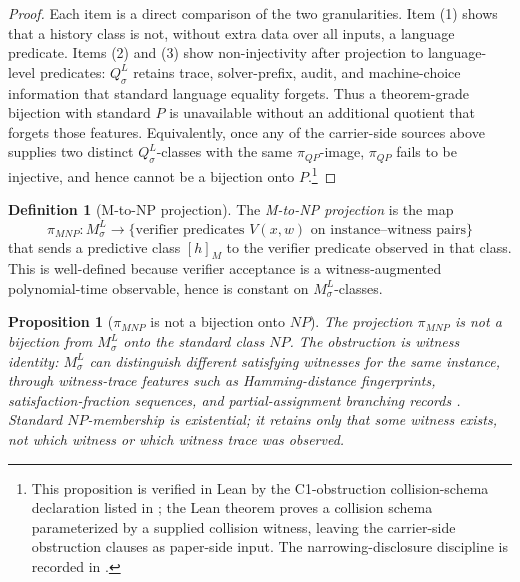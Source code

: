 \documentclass[11pt]{article}
\newcommand{\Substrate}{\sigma}             \newcommand{\Lift}{L}                       \newcommand{\LiftState}{\sigma_{L}}         \newcommand{\HistorySpace}{H_{\Substrate}^{\Lift}}
\newcommand{\Qquotient}{Q_{\Substrate}^{\Lift}}
\newcommand{\Mquotient}{M_{\Substrate}^{\Lift}}
\newcommand{\Mclass}[1]{[#1]_{M}}
\newcommand{\PiQP}{\pi_{QP}}                \newcommand{\PiMNP}{\pi_{MNP}}
\newtheorem{proposition}[theorem]{Proposition}
\theoremstyle{definition}
\newtheorem{definition}[theorem]{Definition}
\begin{document}
\begin{proof}
Each item is a direct comparison of the two granularities.  Item (1)
shows that a history class is not, without extra data over all inputs,
a language predicate.  Items (2) and (3) show non-injectivity after
projection to language-level predicates: \(\Qquotient\) retains trace,
solver-prefix, audit, and machine-choice information that standard
language equality forgets.  Thus a theorem-grade bijection with
standard \(P\) is unavailable without an additional quotient that
forgets those features.  Equivalently, once any of the carrier-side
sources above supplies two distinct \(\Qquotient\)-classes with the same
\(\PiQP\)-image, \(\PiQP\) fails to be injective, and hence cannot be a
bijection onto \(P\).\footnote{This proposition is verified in Lean by
the C1-obstruction collision-schema declaration listed in
; the Lean theorem proves a collision schema
parameterized by a supplied collision witness, leaving the carrier-side
obstruction clauses as paper-side input.  The narrowing-disclosure
discipline is recorded in .}
\end{proof}

\begin{definition}[M-to-NP projection]
\label{def:projection-m-to-np}
The \emph{M-to-NP projection} is the map
\[
  \PiMNP:\Mquotient\longrightarrow
  \{\text{verifier predicates }V(x,w)\text{ on instance--witness pairs}\}
\]
that sends a predictive class \(\Mclass{h}\) to the verifier predicate
observed in that class.  This is well-defined because verifier
acceptance is a witness-augmented polynomial-time observable, hence is
constant on \(\Mquotient\)-classes.
\end{definition}

\begin{proposition}[\(\PiMNP\) is not a bijection onto \(NP\)]
\label{prop:c2-not-bijective}
The projection \(\PiMNP\) is not a bijection from \(\Mquotient\) onto
the standard class \(NP\).  The obstruction is witness identity:
\(\Mquotient\) can distinguish different satisfying witnesses for the
same instance, through witness-trace features such as Hamming-distance
fingerprints, satisfaction-fraction sequences, and partial-assignment
branching records \citep{BiereHeuleMaarenWalsh2009HandbookSAT}.  Standard \(NP\)-membership is existential; it
retains only that some witness exists, not which witness or which
witness trace was observed.
\end{proposition}
\end{document}
